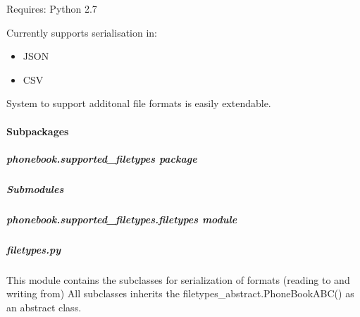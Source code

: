 \documentclass[letterpaper,10pt,english]{sphinxmanual}
\begin{document}
Requires: Python 2.7

Currently supports serialisation in:
\begin{itemize}
\item {} 
JSON

\item {} 
CSV

\end{itemize}

System to support additonal file formats is easily extendable.


\paragraph{Subpackages}
\label{\detokenize{phonebook:subpackages}}

\subparagraph{phonebook.supported\_filetypes package}
\label{\detokenize{phonebook.supported_filetypes:module-phonebook.supported_filetypes}}\label{\detokenize{phonebook.supported_filetypes:phonebook-supported-filetypes-package}}\label{\detokenize{phonebook.supported_filetypes::doc}}

\subparagraph{Submodules}
\label{\detokenize{phonebook.supported_filetypes:submodules}}

\subparagraph{phonebook.supported\_filetypes.filetypes module}
\label{\detokenize{phonebook.supported_filetypes:module-phonebook.supported_filetypes.filetypes}}\label{\detokenize{phonebook.supported_filetypes:phonebook-supported-filetypes-filetypes-module}}

\subparagraph{filetypes.py}
\label{\detokenize{phonebook.supported_filetypes:filetypes-py}}
This module contains the subclasses for serialization of formats (reading to and writing from)
All subclasses inherits the filetypes\_abstract.PhoneBookABC() as an abstract class.
\end{document}
